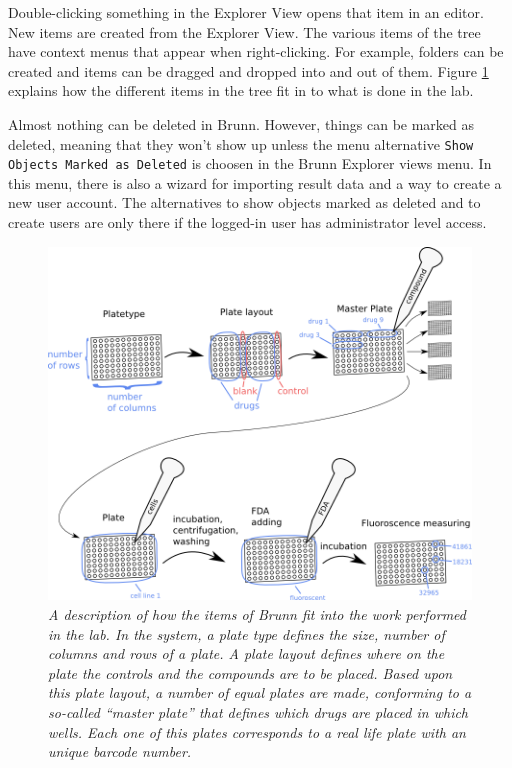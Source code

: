 \documentclass[a4paper,10pt]{article}
\begin{document}
            Double-clicking something in the Explorer View opens that item in
            an editor. New items are created from the Explorer View. The
            various items of the tree have context menus that appear when
            right-clicking. For example, folders can be created and items can be
            dragged and dropped into and out of them. Figure \ref{labWork}
            explains how the different items in the tree fit in to what is done
            in the lab.  

            Almost nothing can be deleted in Brunn. However, things can be
            marked as deleted, meaning that they won't show up unless the menu
            alternative \texttt{Show Objects Marked as Deleted} is choosen in
            the Brunn Explorer views menu. In this menu, there is also a wizard
            for importing result data and a way to create a new user account.
            The alternatives to show objects marked as deleted and to create
            users are only there if the logged-in user has administrator
            level access.
        
        \begin{figure}[htbp]
            \begin{center}
                \includegraphics[width=1\textwidth]{images/labWork.png}
            \end{center}
            \caption{\textit{A description of how the items of Brunn fit into
                             the work performed in the lab. In the system, a
                             plate type defines the size, number of columns and
                             rows of a plate. A plate layout defines where on
                             the plate the controls and the compounds are to be
                             placed. Based upon this plate layout, a number of
                             equal plates are made, conforming to a so-called
                             “master plate” that defines which drugs are placed
                             in which wells. Each one of this plates corresponds
                             to a real life plate with an unique barcode
                             number. }}
            \label{labWork}
        \end{figure}
\end{document}
